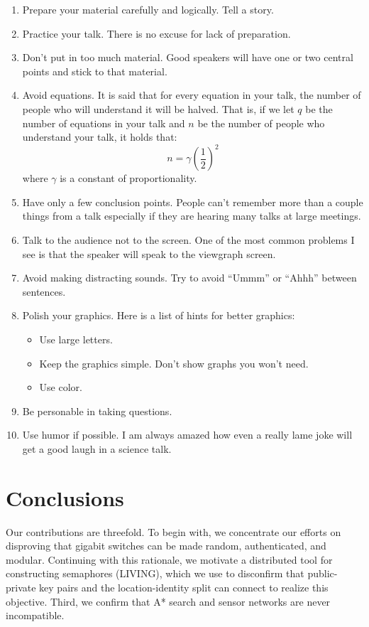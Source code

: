 \documentclass{article}
\begin{document}
\begin{enumerate}
\item  Prepare your material carefully and logically. Tell a story.
\item  Practice your talk. There is no excuse for lack of preparation.
\item Don’t put in too much material. Good speakers will have one or two central points and stick to that material.
\item Avoid equations. It is said that for every equation in your talk, the number of people who will understand it will be halved. That is, if we let $q$ be the number of equations in your talk and $n$ be the number of people who understand your talk, it holds that:
\begin{equation}
n = \gamma \left(\frac{1}{2}\right)^{2} \label{eq:fundamental}
\end{equation}
where $\gamma$ is a constant of proportionality.
\item Have only a few conclusion points. People can’t remember more than a couple things from a talk especially if they are hearing many talks at large meetings.
\item Talk to the audience not to the screen. One of the most common problems I see is that the speaker will speak to the viewgraph screen.
\item Avoid making distracting sounds. Try to avoid ``Ummm'' or ``Ahhh'' between sentences.
\item  Polish your graphics. Here is a list of hints for better graphics:
	\begin{itemize}
	\item Use large letters.
	\item Keep the graphics simple. Don’t show graphs you won’t need.
	\item Use color.
	\end{itemize}
\item  Be personable in taking questions.
\item Use humor if possible. I am always amazed how even a really lame joke will get a good laugh in a science talk.
\end{enumerate}





\section{Conclusions}
\label{sec:conc}

Our contributions are threefold. To begin with, we concentrate our efforts on disproving that gigabit switches can be made random, authenticated, and modular. Continuing with this rationale, we motivate a distributed tool for constructing semaphores (LIVING), which we use to disconfirm that public-private key pairs and the location-identity split can connect to realize this objective. Third, we confirm that A* search and sensor networks are never incompatible.\\[6pt]
\end{document}
